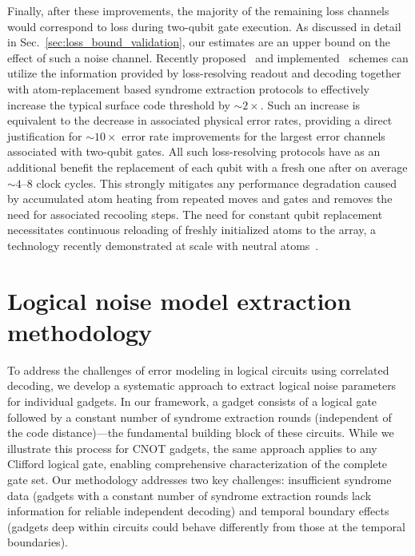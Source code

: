 \documentclass[aps, prx, reprint, superscriptaddress, longbibliography, floatfix]{revtex4-2}
\begin{document}
Finally, after these improvements, the majority of the remaining loss channels would correspond to loss during two-qubit gate execution. As discussed in detail in Sec.~\ref{sec:loss_bound_validation}, our estimates are an upper bound on the effect of such a noise channel. Recently proposed~\cite{baranes2025} and implemented~\cite{Bluvstein2022} schemes can utilize the information provided by loss-resolving readout and decoding together with atom-replacement based syndrome extraction protocols to effectively increase the typical surface code threshold by $\sim 2 \times$. Such an increase is equivalent to the decrease in associated physical error rates, providing a direct justification for $\sim 10 \times$ error rate improvements for the largest error channels associated with two-qubit gates.  All such loss-resolving protocols have as an additional benefit the replacement of each qubit with a fresh one after on average $\sim 4$--$8$ clock cycles. This strongly mitigates any performance degradation caused by accumulated atom heating from repeated moves and gates and removes the need for associated recooling steps. The need for constant qubit replacement necessitates continuous reloading of freshly initialized atoms to the array, a technology recently demonstrated at scale with neutral atoms~\cite{Gyger2024, Chiu2025}. 


\section{Logical noise model extraction methodology}
\label{app:extraction}

To address the challenges of error modeling in logical circuits using correlated decoding, we develop a systematic approach to extract logical noise parameters for individual gadgets. In our framework, a gadget consists of a logical gate followed by a constant number of syndrome extraction rounds (independent of the code distance)—the fundamental building block of these circuits. While we illustrate this process for CNOT gadgets, the same approach applies to any Clifford logical gate, enabling comprehensive characterization of the complete gate set. Our methodology addresses two key challenges: insufficient syndrome data (gadgets with a constant number of syndrome extraction rounds lack information for reliable independent decoding) and temporal boundary effects (gadgets deep within circuits could behave differently from those at the temporal boundaries).
\end{document}
